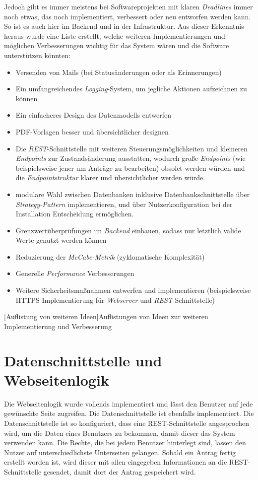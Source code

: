 Jedoch gibt es immer meistens bei Softwareprojekten mit klaren \textit{Deadlines} immer noch etwas, das noch implementiert, verbessert oder neu entworfen werden kann. So ist es auch hier im Backend und in der Infrastruktur. Aus dieser Erkenntnis heraus wurde eine Liste erstellt, welche weiteren Implementierungen und möglichen Verbesserungen wichtig für das System wären und die Software unterstützen könnten:

\begin{itemize}
	\item Versenden von Mails (bei Statusänderungen oder als Erinnerungen)
	\item Ein umfangreichendes \textit{Logging}-System, um jegliche Aktionen aufzeichnen zu können
	\item Ein einfacheres Design des Datenmodells entwerfen
	\item PDF-Vorlagen besser und übersichtlicher designen
	\item Die \textit{REST}-Schnittstelle mit weiteren Steuerungsmöglichkeiten und kleineren \textit{Endpoints} zur Zustandsänderung ausstatten, wodurch große \textit{Endpoints} (wie beispielsweise jener um Anträge zu bearbeiten) obsolet werden würden und die \textit{Endpointstruktur} klarer und übersichtlicher werden würde.
	\item modulare Wahl zwischen Datenbanken inklusive Datenbankschnittstelle über \textit{Strategy-Pattern} implementieren, und über Nutzerkonfiguration bei der Installation Entscheidung ermöglichen.
	\item Grenzwertüberprüfungen im \textit{Backend} einbauen, sodass nur letztlich valide Werte genutzt werden können
	\item Reduzierung der \textit{McCabe-Metrik} (zyklomatische Komplexität)
	\item Generelle \textit{Performance} Verbesserungen
	\item Weitere Sicherheitsmaßnahmen entwerfen und implementieren (beispielsweise HTTPS Implementierung für \textit{Webserver} und \textit{REST}-Schnittstelle)
\end{itemize}
[Auflistung von weiteren Ideen]{Auflistungen von Ideen zur weiteren Implementierung und Verbesserung}
\newpage
\section{Datenschnittstelle und Webseitenlogik}
Die Webseitenlogik wurde vollends implementiert und lässt den Benutzer auf jede gewünschte Seite zugreifen. Die Datenschnittstelle ist ebenfalls implementiert. Die Datenschnittstelle ist so konfiguriert, dass eine REST-Schnittstelle angesprochen wird, um die Daten eines Benutzers zu bekommen, damit dieser das System verwenden kann. Die Rechte, die bei jedem Benutzer hinterlegt sind, lassen den Nutzer auf unterschiedlichste Unterseiten gelangen. Sobald ein Antrag fertig erstellt worden ist, wird dieser mit allen eingegeben Informationen an die REST-Schnittstelle gesendet, damit dort der Antrag gespeichert wird.\\

